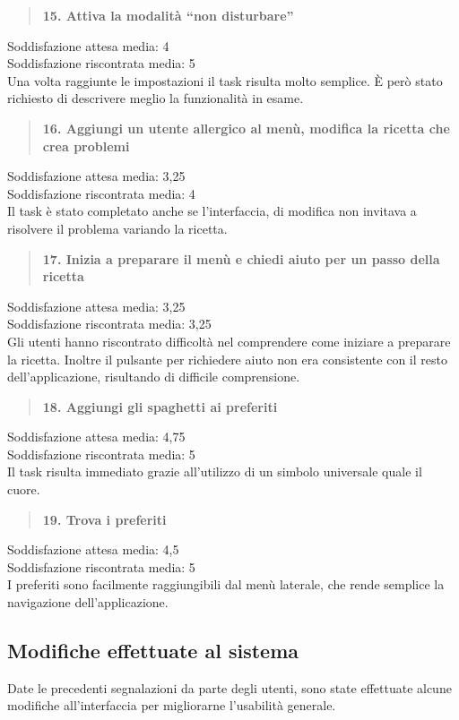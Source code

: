 \begin{quote}
	\textbf{15. Attiva la modalità ``non disturbare''}
\end{quote}
Soddisfazione attesa media: 4\\
Soddisfazione riscontrata media: 5\\
Una volta raggiunte le impostazioni il task risulta molto semplice.  È però
stato richiesto di descrivere meglio la funzionalità in esame.

\begin{quote}
	\textbf{16. Aggiungi un utente allergico al menù, modifica la ricetta che
	crea problemi}
\end{quote}
Soddisfazione attesa media: 3,25\\
Soddisfazione riscontrata media: 4\\
Il task è stato completato anche se l'interfaccia, di modifica non invitava a
risolvere il problema variando la ricetta.

\begin{quote}
	\textbf{17. Inizia a preparare il menù e chiedi aiuto per un passo della
	ricetta}
\end{quote}
Soddisfazione attesa media: 3,25\\
Soddisfazione riscontrata media: 3,25\\
Gli utenti hanno riscontrato difficoltà nel comprendere come iniziare a
preparare la ricetta.  Inoltre il pulsante per richiedere aiuto non era
consistente con il resto dell'applicazione, risultando di difficile
comprensione.

\begin{quote}
	\textbf{18. Aggiungi gli spaghetti ai preferiti}
\end{quote}
Soddisfazione attesa media: 4,75\\
Soddisfazione riscontrata media: 5\\
Il task risulta immediato grazie all'utilizzo di un simbolo universale quale il
cuore.

\begin{quote}
	\textbf{19. Trova i preferiti}
\end{quote}
Soddisfazione attesa media: 4,5\\
Soddisfazione riscontrata media: 5\\
I preferiti sono facilmente raggiungibili dal menù laterale, che rende semplice
la navigazione dell'applicazione.

\subsection{Modifiche effettuate al sistema}
Date le precedenti segnalazioni da parte degli utenti, sono state effettuate
alcune modifiche all'interfaccia per migliorarne l'usabilità generale.

